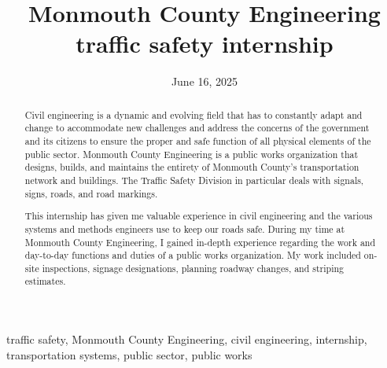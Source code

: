 ﻿\documentclass[12pt,conference,onecolumn]{IEEEtran}
\title{{M}onmouth {C}ounty {E}ngineering traffic safety internship}
\author{\IEEEauthorblockN{Aadarsh Kumar}\IEEEauthorblockA{Science \& Engineering\\Manalapan High School\\Englishtown, NJ\\425akumar@frhsd.com}}
\date{June 16, 2025}
\newcommand{\keywords}{traffic safety, Monmouth County Engineering, civil engineering, internship, transportation systems, public sector, public works}
\begin{document}
\maketitle 

\begin{abstract}
Civil engineering is a dynamic and evolving field that has to constantly adapt and change to accommodate new challenges and address the concerns of the government and its citizens to ensure the proper and safe function of all physical elements of the public sector. Monmouth County Engineering is a public works organization that designs, builds, and maintains the entirety of Monmouth County's transportation network and buildings. The Traffic Safety Division in particular deals with signals, signs, roads, and road markings. 

This internship has given me valuable experience in civil engineering and the various systems and methods engineers use to keep our roads safe. During my time at Monmouth County Engineering, I gained in-depth experience regarding the work and day-to-day functions and duties of a public works organization. My work included on-site inspections, signage designations, planning roadway changes, and striping estimates.
\end{abstract}

\begin{IEEEkeywords}
\keywords
\end{IEEEkeywords}
\end{document}

